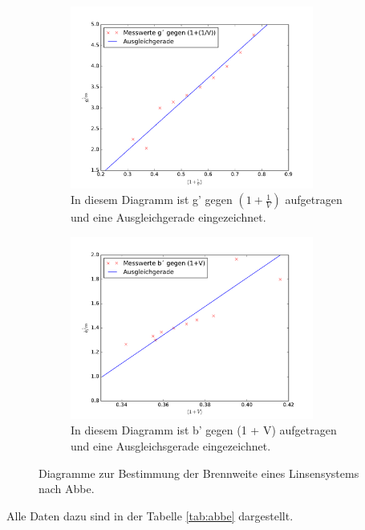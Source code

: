 \begin{figure}
  \centering
    \begin{subfigure}{0.48\textwidth}
      \includegraphics[height = 6cm]{plots/gsplot.pdf}
      \caption{In diesem Diagramm ist g' gegen
      \texorpdfstring{$\left(1 + \frac{1}{V}\right)$}{math} aufgetragen und
      eine Ausgleichgerade eingezeichnet. }
      \label{fig:gabbe}
    \end{subfigure}
    \begin{subfigure}{0.48\textwidth}
      \includegraphics[height = 6cm]{plots/bsplot.pdf}
      \caption{In diesem Diagramm ist b' gegen (1 + V) aufgetragen und
      eine Ausgleichsgerade eingezeichnet. }
      \label{fig:babbe}
    \end{subfigure}
    \caption{Diagramme zur Bestimmung der Brennweite eines Linsensystems nach Abbe.}
    \label{fig:abbe}
\end{figure}
Alle Daten dazu sind in der Tabelle \ref{tab:abbe} dargestellt.
